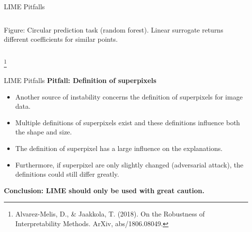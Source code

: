 \documentclass[11pt,compress,t,notes=noshow, xcolor=table]{beamer}
\begin{document}
\begin{vbframe}{LIME Pitfalls}
\begin{columns}
\begin{column}{0.48\textwidth}
\begin{center}
	\tiny{Figure: Circular prediction task (random forest). Linear surrogate returns different coefficients for similar points.}
	
	\end{center}
\end{column}
\end{columns}
\vspace{-0.2cm}
\footnote[frame]{Alvarez-Melis, D., \& Jaakkola, T. (2018). On the Robustness of Interpretability Methods. ArXiv, abs/1806.08049.}
\end{vbframe}

\begin{vbframe}{LIME Pitfalls}
\textbf{Pitfall: Definition of superpixels}
\begin{itemize}
	\item Another source of instability concerns the definition of superpixels for image data. 
	\item Multiple definitions of superpixels exist and these definitions influence both the shape and size. 
	\item The definition of superpixel has a large influence on the explanations. 
	\item Furthermore, if superpixel are only slightly changed (adversarial attack), the definitions could still differ greatly.  
\end{itemize}

\textbf{Conclusion: LIME should only be used with great caution.}

\end{vbframe}

%	


\endlecture
\end{document}
